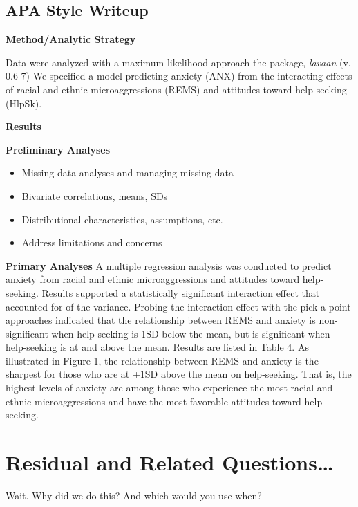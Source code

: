 \documentclass[
  11pt,
]{book}
\providecommand{\tightlist}{%
  \setlength{\itemsep}{0pt}\setlength{\parskip}{0pt}}
\begin{document}
\hypertarget{apa-style-writeup-3}{%
\subsection{APA Style Writeup}\label{apa-style-writeup-3}}

\textbf{Method/Analytic Strategy}

Data were analyzed with a maximum likelihood approach the package, \emph{lavaan} (v. 0.6-7) We specified a model predicting anxiety (ANX) from the interacting effects of racial and ethnic microaggressions (REMS) and attitudes toward help-seeking (HlpSk).

\textbf{Results}

\textbf{Preliminary Analyses}

\begin{itemize}
\tightlist
\item
  Missing data analyses and managing missing data
\item
  Bivariate correlations, means, SDs
\item
  Distributional characteristics, assumptions, etc.
\item
  Address limitations and concerns
\end{itemize}

\textbf{Primary Analyses} A multiple regression analysis was conducted to predict anxiety from racial and ethnic microaggressions and attitudes toward help-seeking. Results supported a statistically significant interaction effect that accounted for of the variance. Probing the interaction effect with the pick-a-point approaches indicated that the relationship between REMS and anxiety is non-significant when help-seeking is 1SD below the mean, but is significant when help-seeking is at and above the mean. Results are listed in Table 4. As illustrated in Figure 1, the relationship between REMS and anxiety is the sharpest for those who are at +1SD above the mean on help-seeking. That is, the highest levels of anxiety are among those who experience the most racial and ethnic microaggressions and have the most favorable attitudes toward help-seeking.

\hypertarget{residual-and-related-questions-1}{%
\section{Residual and Related Questions\ldots{}}\label{residual-and-related-questions-1}}

Wait. Why did we do this? And which would you use when?
\end{document}
